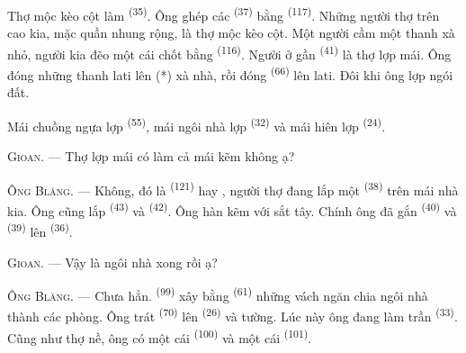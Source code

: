 Thợ mộc kèo cột làm  \textsuperscript{(35)}. Ông ghép các
 \textsuperscript{(37)} bằng  \textsuperscript{(117)}. Những
người thợ trên cao kia, mặc quần nhung rộng, là thợ mộc kèo cột. Một người cầm một
thanh xà nhỏ, người kia đẽo một cái chốt bằng  \textsuperscript{(116)}.
Người ở gần  \textsuperscript{(41)} là thợ lợp mái. Ông đóng những
thanh lati lên (*) xà nhà, rồi đóng  \textsuperscript{(66)} lên lati.
Đôi khi ông lợp ngói đất.


Mái chuồng ngựa lợp  \textsuperscript{(55)}, mái ngôi nhà lợp
 \textsuperscript{(32)} và mái hiên lợp 
\textsuperscript{(24)}.

\textsc{Gioan}. --- Thợ lợp mái có làm cả mái kẽm không ạ?

\textsc{Ông Blăng}. --- Không, đó là  \textsuperscript{(121)} hay
, người thợ đang lắp một 
\textsuperscript{(38)} trên mái nhà kia. Ông cũng lắp 
\textsuperscript{(43)} và  \textsuperscript{(42)}. Ông hàn kẽm với sắt
tây. Chính ông đã gắn  \textsuperscript{(40)} và \textsuperscript{(39)} lên  \textsuperscript{(36)}.

\textsc{Gioan}. --- Vậy là ngôi nhà xong rồi ạ?

\VUsaut{3.0mm}
\VUsaut{3.0mm}

\textsc{Ông Blăng}. --- Chưa hẳn.  \textsuperscript{(99)} xây bằng
 \textsuperscript{(61)} những vách ngăn chia ngôi nhà thành các phòng. Ông
trát  \textsuperscript{(70)} lên 
\textsuperscript{(26)} và tường. Lúc này ông đang làm trần 
\textsuperscript{(33)}. Cũng như thợ nề, ông có một cái 
\textsuperscript{(100)} và một cái  \textsuperscript{(101)}.

